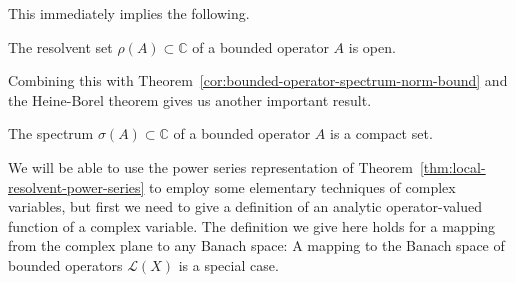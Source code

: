 This immediately implies the following.

\begin{Corollary}
\label{cor:bounded-operator-resolvent-set-open}
The resolvent set $\rho(A)\subset\mathbb{C}$ of a bounded operator $A$ is open.
\end{Corollary}

Combining this with Theorem~\ref{cor:bounded-operator-spectrum-norm-bound} and the Heine-Borel theorem gives us another important result.

\begin{Corollary}
\label{cor:bounded-operator-spectrum-compact}
The spectrum $\sigma(A)\subset\mathbb{C}$ of a bounded operator $A$ is a compact set.
\end{Corollary}

We will be able to use the power series representation of Theorem~\ref{thm:local-resolvent-power-series} to employ some elementary techniques of complex variables, but first we need to give a definition of an analytic operator-valued function of a complex variable. The definition we give here holds for a mapping from the complex plane to any Banach space: A mapping to the Banach space of bounded operators $\mathcal{L}(X)$ is a special case.
